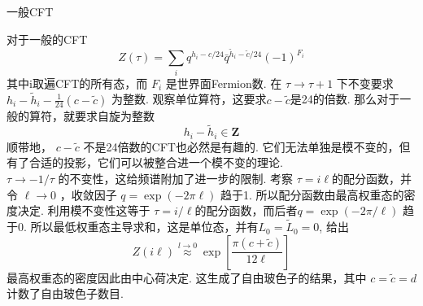 \centerline{\Large 一般CFT}
对于一般的CFT
\begin{equation}
Z(\tau)=\sum_{i} q^{h_{i}-c / 24} \bar{q}^{\tilde{h}_{i}-\tilde{c} / 24}(-1)^{F_{i}}
\end{equation}
其中i取遍CFT的所有态，而 $F_{i}$ 是世界面Fermion数. 在 $\tau \rightarrow \tau+1$ 下不变要求 $h_{i}-\tilde{h}_{i}-\frac{1}{24}(c-\tilde{c})$ 为整数. 观察单位算符，这要求$c-\tilde{c}$是24的倍数. 那么对于一般的算符，就要求自旋为整数
\begin{equation}
h_{i}-\tilde{h}_{i} \in \mathbf{Z}
\end{equation}
顺带地， $c-\tilde{c}$ 不是24倍数的CFT也必然是有趣的. 它们无法单独是模不变的，但有了合适的投影，它们可以被整合进一个模不变的理论.\\
$\tau \rightarrow-1 / \tau$ 的不变性，这给频谱附加了进一步的限制. 考察 $\tau=i \ell$的配分函数，并令 $\ell \rightarrow 0 $ ，收敛因子 $q=\exp (-2 \pi \ell)$ 趋于1. 所以配分函数由最高权重态的密度决定. 利用模不变性这等于 $\tau=i / \ell $的配分函数，而后者$q=\exp (-2 \pi / \ell)$ 趋于0. 所以最低权重态主导求和，这是单位态，并有$L_{0}=\tilde{L}_{0}=0$, 给出
\begin{equation}
Z(i \ell) \stackrel{l \rightarrow 0}{\approx} \exp \left[\frac{\pi(c+\tilde{c})}{12 \ell}\right]
\end{equation}
最高权重态的密度因此由中心荷决定. 这生成了自由玻色子的结果，其中 $c=\tilde{c}=d$计数了自由玻色子数目.\\

